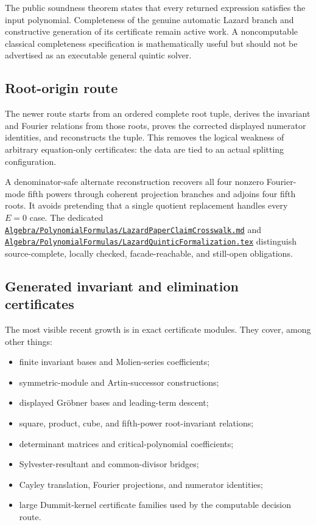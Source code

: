 \documentclass[
  10pt,
  a4paper,
  twoside,
  open=any,
  parskip=half,
  headings=big
]{scrreprt}
\newcommand{\CommitFull}{56a402bf82a9aab119fcbe3e96b991d387b221c5}
\newcommand{\RepoWeb}{https://github.com/VladimirReshetnikov/ProveIt}
\newcommand{\RepoBlobBase}{\RepoWeb/blob/\CommitFull}
\newcommand{\RepoFile}[1]{\href{\RepoBlobBase/#1}{\nolinkurl{#1}}}
\begin{document}
The public soundness theorem states that every returned expression satisfies the input polynomial. Completeness of the genuine automatic Lazard branch and constructive generation of its certificate remain active work. A noncomputable classical completeness specification is mathematically useful but should not be advertised as an executable general quintic solver.

\subsection{Root-origin route}

The newer route starts from an ordered complete root tuple, derives the invariant and Fourier relations from those roots, proves the corrected displayed numerator identities, and reconstructs the tuple. This removes the logical weakness of arbitrary equation-only certificates: the data are tied to an actual splitting configuration.

A denominator-safe alternate reconstruction recovers all four nonzero Fourier-mode fifth powers through coherent projection branches and adjoins four fifth roots. It avoids pretending that a single quotient replacement handles every \(E=0\) case. The dedicated \RepoFile{Algebra/PolynomialFormulas/LazardPaperClaimCrosswalk.md} and \RepoFile{Algebra/PolynomialFormulas/LazardQuinticFormalization.tex} distinguish source-complete, locally checked, facade-reachable, and still-open obligations.

\subsection{Generated invariant and elimination certificates}

The most visible recent growth is in exact certificate modules. They cover, among other things:

\begin{itemize}
  \item finite invariant bases and Molien-series coefficients;
  \item symmetric-module and Artin-successor constructions;
  \item displayed Gr\"obner bases and leading-term descent;
  \item square, product, cube, and fifth-power root-invariant relations;
  \item determinant matrices and critical-polynomial coefficients;
  \item Sylvester-resultant and common-divisor bridges;
  \item Cayley translation, Fourier projections, and numerator identities;
  \item large Dummit-kernel certificate families used by the computable decision route.
\end{itemize}
\end{document}
